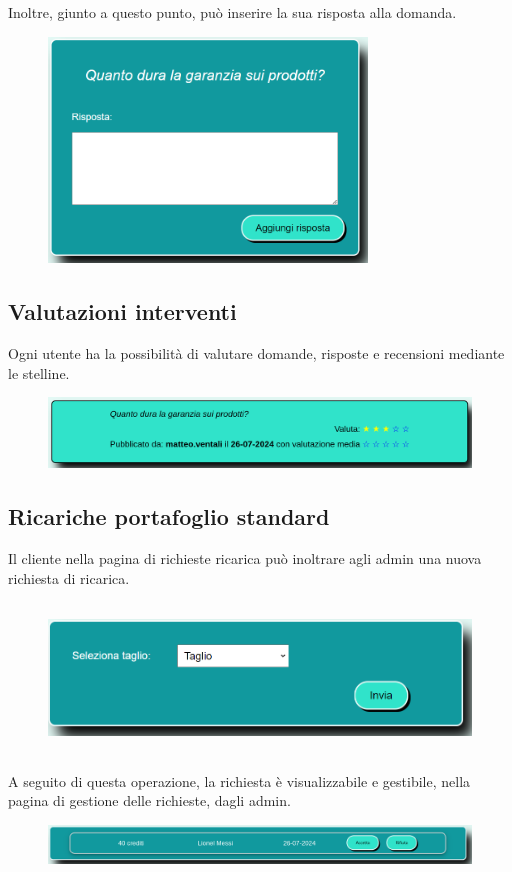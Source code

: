 \documentclass[a4paper, 14pt]{article}
\begin{document}
\begin{flushleft}
\begin{figure}[H]
				\end{figure}
				Inoltre, giunto a questo punto, può inserire la sua risposta alla domanda.
				\begin{figure}[H]
					\centering
					\includegraphics[height=6cm, frame=2pt]{"screenInserimentoRisposta.png"}	
				\end{figure}
			
			\subsection{Valutazioni interventi}
				Ogni utente ha la possibilità di valutare domande, risposte e recensioni mediante le stelline.
				\begin{figure}[H]
					\centering
					\includegraphics[width=\textwidth, frame=2pt]{"screenValutazione.png"}	
				\end{figure}
			
			\subsection{Ricariche portafoglio standard}
				Il cliente nella pagina di richieste ricarica può inoltrare agli admin una nuova richiesta di ricarica.
				\begin{figure}[H]
					\centering
					\includegraphics[height=4cm, frame=2pt]{"screenRichiestaRicarica.png"}	
				\end{figure}
				A seguito di questa operazione, la richiesta è visualizzabile e gestibile, nella pagina di gestione delle richieste, dagli admin.
				\begin{figure}[H]
					\centering
					\includegraphics[width=\textwidth, frame=2pt]{"screenGestioneRicariche.png"}	
				\end{figure}
			

\end{flushleft}
\end{document}
